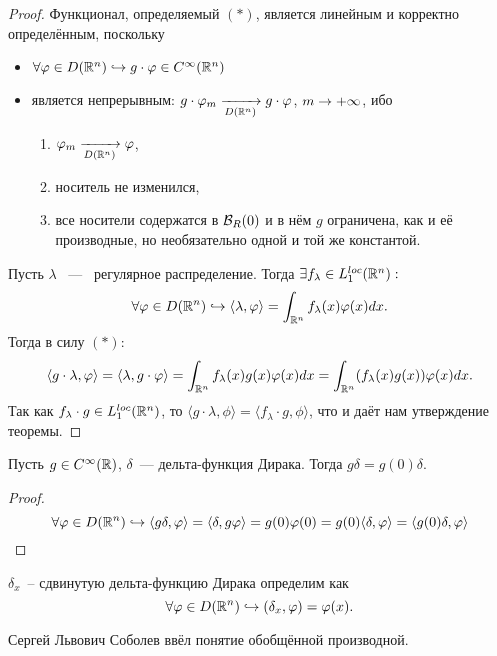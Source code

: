 \begin{proof} Функционал, определяемый $(\ast)$, является линейным и корректно определённым, поскольку
\begin{itemize}
    \item $\forall \varphi \in D(\mathbb{R}^n) \hookrightarrow g \cdot \varphi \in C^{\infty}(\mathbb{R}^n)$
    \item является непрерывным: $g \cdot\varphi_m \xrightarrow[D(\mathbb{R}^n)]{} g \cdot \varphi$, $m \rightarrow +\infty$, ибо
    \begin{enumerate}
        \item $\varphi_m \xrightarrow[D(\mathbb{R}^n)]{} \varphi$,
        \item носитель не изменился,
        \item все носители содержатся в $\mathcal{B}_R(0)$ и в нём $g$ ограничена, как и её производные, но необязательно одной и той же константой.
    \end{enumerate}
\end{itemize}
Пусть $\lambda$ ~---~ регулярное распределение.
Тогда $\exists f_\lambda \in L_1^{loc}(\mathbb{R}^n):$
\[
    \forall \varphi \in D(\mathbb{R}^n) \hookrightarrow \langle \lambda, \varphi \rangle = \int_{\mathbb{R}^n} f_{\lambda}(x) \varphi(x) dx.
\]
Тогда в силу $(\ast)$:
\[
    \langle g \cdot \lambda, \varphi \rangle = \langle\lambda, g \cdot \varphi \rangle = \int_{\mathbb{R}^n} f_{\lambda}(x) g(x) \varphi(x) dx = \int_{\mathbb{R}^n} (f_\lambda(x) g(x))\varphi(x)dx.
\]
Так как $f_\lambda \cdot g \in L_1^{loc}(\mathbb{R}^n)$, то $\langle g \cdot \lambda, \phi \rangle  = \langle f_\lambda \cdot g, \phi \rangle $, что и даёт нам утверждение теоремы.
\end{proof}
\begin{example}
    Пусть $g \in C^{\infty}(\mathbb{R})$, $\delta$~--- дельта-функция Дирака. Тогда $g\delta = g(0)\delta$.
    \begin{proof}
        \[ \forall \varphi \in D(\mathbb{R}^n) \hookrightarrow
        \langle g \delta, \varphi \rangle  = \langle \delta, g \varphi \rangle = g(0)\varphi(0) = g(0) \langle \delta, \varphi \rangle = \langle g(0)\delta, \varphi \rangle
        \]
    \end{proof}
\end{example}
\begin{definition}
    $\delta_x$~-- сдвинутую дельта-функцию Дирака определим как
    \[
        \forall \varphi \in D(\mathbb{R}^n) \hookrightarrow (\delta_x, \varphi) = \varphi(x).
    \]
\end{definition}
\begin{remark}
    Сергей Львович Соболев ввёл понятие обобщённой производной.
\end{remark}
